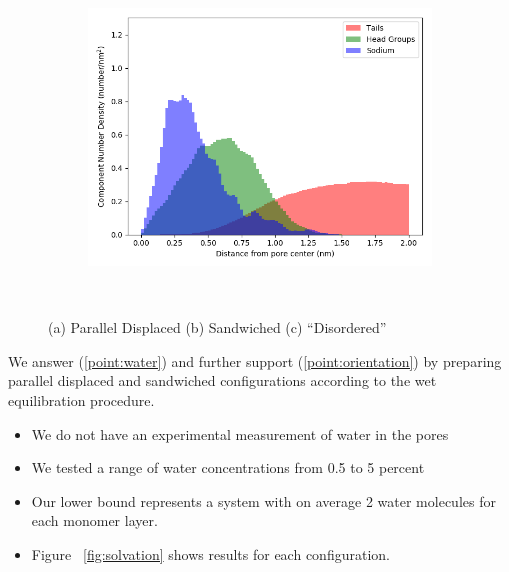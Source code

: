 \documentclass{article}
\begin{document}
\begin{figure}
\begin{subfigure}{0.55\textwidth}
        \caption{}
        \label{fig:offset_density}
  \end{subfigure}
  \begin{subfigure}{0.55\textwidth}
        \includegraphics[width=1\linewidth]{disordered_density.png}
        \caption{}
        \label{fig:offset_density}
  \end{subfigure}
  \caption{(a) Parallel Displaced (b) Sandwiched (c) ``Disordered''}~\label{fig:densities}
  \end{figure}


  We answer (\ref{point:water}) and further support (\ref{point:orientation}) by preparing parallel displaced and
  sandwiched configurations according to the wet equilibration procedure.
  \begin{itemize}
	\item We do not have an experimental measurement of water in the pores
	\item We tested a range of water concentrations from 0.5 to 5 percent %
	\item Our lower bound represents a system with on average 2 water 
	molecules for each monomer layer.
	\item Figure ~\ref{fig:solvation} shows results for each configuration.
  \end{itemize}
\end{document}
